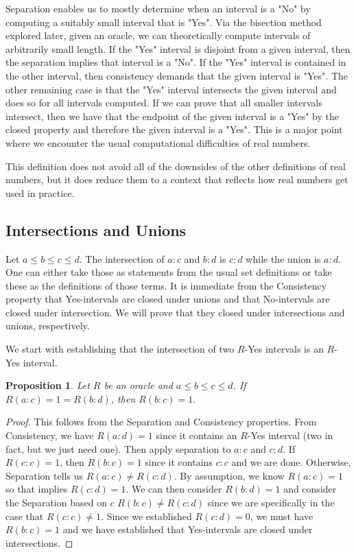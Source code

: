 \documentclass[12pt]{article}
\newtheorem{proposition}{Proposition}
\theoremstyle{remark}
\begin{document}
Separation enables us to mostly determine when an interval is a "No" by computing a suitably small interval that is "Yes". Via the bisection method explored later, given an oracle, we can theoretically compute intervals of arbitrarily small length. If the "Yes" interval is disjoint from a given interval, then the separation implies that interval is a "No". If the "Yes" interval is contained in the other interval, then consistency demands that the given interval is "Yes". The other remaining case is that the "Yes" interval intersects the given interval and does so for all intervals computed. If we can prove that all smaller intervals intersect, then we have that the endpoint of the given interval is a "Yes" by the closed property and therefore the given interval is a "Yes". This is a major point where we encounter the usual computational difficulties of real numbers. 

This definition does not avoid all of the downsides of the other definitions of real numbers, but it does reduce them to a context that reflects how real numbers get used in practice. 

\subsection{ Intersections and Unions}

Let $a \leq b \leq c \leq d$. The intersection of $a:c$ and $b:d$ is $c:d$ while the union is $a:d$. One can either take those as statements from the usual set definitions or take these as the definitions of those terms. It is immediate from the Consistency property that Yes-intervals are closed under unions and that No-intervals are closed under intersection. We will prove that they closed under intersections and unions, respectively. 

We start with establishing that the intersection of two $R$-Yes intervals is an $R$-Yes interval.

\begin{proposition}
Let $R$ be an oracle and $a \leq b \leq c \leq d$. If $R(a:c) = 1 = R(b:d)$, then $R(b:c) = 1$.
\end{proposition}

\begin{proof}
  
  This follows from the Separation and Consistency properties. From Consistency, we have $R(a:d) = 1$ since it contains an $R$-Yes interval (two in fact, but we just need one). Then apply separation to $a:c$ and $c:d$. If $R(c:c) = 1$, then $R(b:c) = 1$ since it contains $c:c$ and we are done. Otherwise, Separation tells us $R(a:c) \neq R(c:d)$. By assumption, we know $R(a:c) = 1$ so that implies $R(c:d) = 1$. We can then consider $R(b:d) = 1$ and consider the Separation based on $c$ $R(b:c) \neq R(c:d)$ since we are specifically in the case that $R(c:c) \neq 1$. Since we established $R(c:d) = 0$, we must have $R(b:c) = 1$ and we have established that Yes-intervals are closed under intersections. 
\end{proof}
\end{document}
